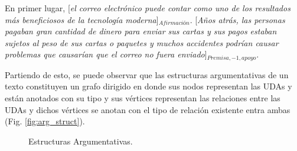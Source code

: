 \begin{adjustwidth}{25pt}{25pt}
    En primer lugar, [\emph{el correo electrónico puede contar como uno de los resultados
    más beneficiosos de la tecnología moderna}]$_{Afirmación}$. [\emph{Años atrás, las personas pagaban gran cantidad de dinero para 
    enviar sus cartas y sus pagos estaban sujetos al peso de sus cartas o paquetes y muchos accidentes podrían 
    causar problemas que causarían que el correo no fuera enviado}]$_{Premisa, -1, apoyo}$.
\end{adjustwidth}

Partiendo de esto, se puede observar que las estructuras argumentativas de un texto constituyen un grafo dirigido 
en donde sus nodos representan las UDAs y están anotados con su tipo y sus vértices representan las 
relaciones entre las UDAs y dichos vértices se anotan con el tipo de relación existente entra ambas 
(Fig. \ref{fig:arg_struct}).

\begin{figure}[h!]
	\begin{center}
		\begin{center}
            
        \end{center}
	    \caption{Estructuras Argumentativas.}
	\end{center}
\end{figure}\label{fig:arg_struct}

